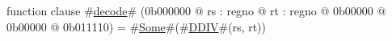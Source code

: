 function clause #\hyperref[zdecode]{decode}# (0b000000 @ rs : regno @ rt : regno @ 0b00000 @ 0b00000 @ 0b011110) =
  #\hyperref[zSome]{Some}#(#\hyperref[zDDIV]{DDIV}#(rs, rt))
